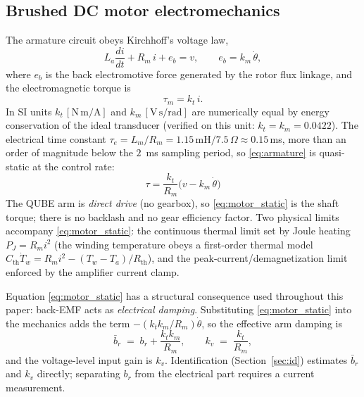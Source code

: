 \documentclass[conference]{IEEEtran}
\begin{document}
\subsection{Brushed DC motor electromechanics}
The armature circuit obeys Kirchhoff's voltage law,
\begin{equation}
L_a \frac{di}{dt} + R_m\, i + e_b = v, \qquad e_b = k_m\,\dot\theta,
\label{eq:armature}
\end{equation}
where $e_b$ is the back electromotive force generated by the rotor flux linkage, and the electromagnetic torque is
\begin{equation}
\tau_m = k_t\, i .
\end{equation}
In SI units $k_t\,[\mathrm{N\,m/A}]$ and $k_m\,[\mathrm{V\,s/rad}]$ are numerically equal by energy conservation of the ideal transducer (verified on this unit: $k_t = k_m = 0.0422$). The electrical time constant $\tau_e = L_m/R_m = 1.15\,\mathrm{mH}/7.5\,\Omega \approx 0.15\,$ms, more than an order of magnitude below the $2$~ms sampling period, so \eqref{eq:armature} is quasi-static at the control rate:
\begin{equation}
\boxed{\;\tau = \frac{k_t}{R_m}\bigl(v - k_m\,\dot\theta\bigr)\;}
\label{eq:motor_static}
\end{equation}
The QUBE arm is \emph{direct drive} (no gearbox), so \eqref{eq:motor_static} is the shaft torque; there is no backlash and no gear efficiency factor. Two physical limits accompany \eqref{eq:motor_static}: the continuous thermal limit set by Joule heating $P_J = R_m i^2$ (the winding temperature obeys a first-order thermal model $C_{\mathrm{th}}\dot T_w = R_m i^2 - (T_w-T_a)/R_{\mathrm{th}}$), and the peak-current/demagnetization limit enforced by the amplifier current clamp.

Equation \eqref{eq:motor_static} has a structural consequence used throughout this paper: back-EMF acts as \emph{electrical damping}. Substituting \eqref{eq:motor_static} into the mechanics adds the term $-(k_t k_m/R_m)\dot\theta$, so the effective arm damping is
\begin{equation}
\bar b_r \;=\; b_r + \frac{k_t k_m}{R_m},
\qquad
k_v \;=\; \frac{k_t}{R_m},
\label{eq:emf_damping}
\end{equation}
and the voltage-level input gain is $k_v$. Identification (Section~\ref{sec:id}) estimates $\bar b_r$ and $k_v$ directly; separating $b_r$ from the electrical part requires a current measurement.
\end{document}

